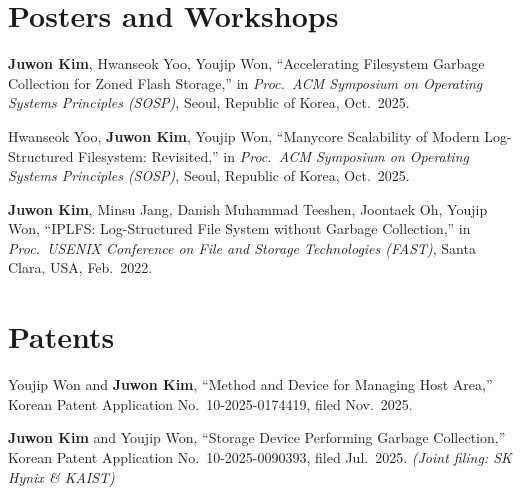 \documentclass[11pt,a4paper]{article}
\begin{document}
\section{Posters and Workshops}
\begin{enumerate}[leftmargin=1.6em, label={[\arabic*]}, nosep, itemsep=5pt]


\item \textbf{Juwon Kim}, Hwanseok Yoo, Youjip Won,
      ``Accelerating Filesystem Garbage Collection for Zoned Flash Storage,''
      in \textit{Proc.\ ACM Symposium on Operating Systems Principles (SOSP)},
      Seoul, Republic of Korea, Oct.\ 2025.


\item Hwanseok Yoo, \textbf{Juwon Kim}, Youjip Won,
      ``Manycore Scalability of Modern Log-Structured
Filesystem: Revisited,''
      in \textit{Proc.\ ACM Symposium on Operating Systems Principles (SOSP)},
      Seoul, Republic of Korea, Oct.\ 2025.


\item \textbf{Juwon Kim}, Minsu Jang, Danish Muhammad Teeshen, Joontaek Oh, Youjip Won,
      ``IPLFS: Log-Structured File System without Garbage Collection,''
      in \textit{Proc.\ USENIX Conference on File and Storage Technologies (FAST)},
      Santa Clara, USA, Feb.\ 2022.



\end{enumerate}


\section{Patents}
\begin{enumerate}[leftmargin=1.6em, label={[\arabic*]}, nosep, itemsep=5pt]

\item Youjip Won and \textbf{Juwon Kim},
      ``Method and Device for Managing Host Area,''
      Korean Patent Application No.\ 10-2025-0174419,
      filed Nov.\ 2025.

\item \textbf{Juwon Kim} and Youjip Won,
      ``Storage Device Performing Garbage Collection,''
      Korean Patent Application No.\ 10-2025-0090393,
      filed Jul.\ 2025.
      \textit{(Joint filing: SK Hynix \& KAIST)}

\end{enumerate}


\end{document}
